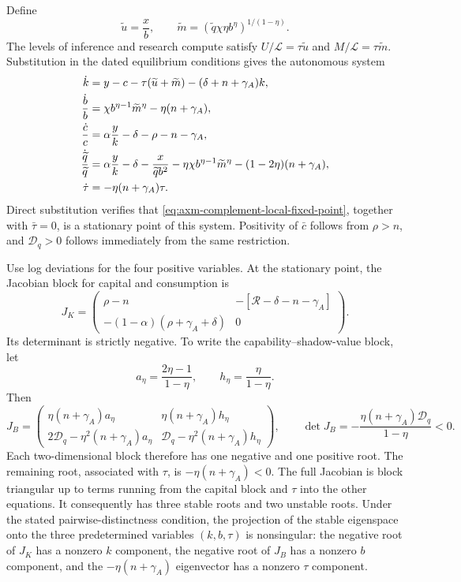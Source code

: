 Define
\[
 \widetilde u=\frac{x}{b},\qquad
 \widetilde m=
 \left(\widetilde q\chi\eta b^\eta\right)^{1/(1-\eta)}.
\]
The levels of inference and research compute satisfy
\(U/\mathcal L=\tau\widetilde u\) and
\(M/\mathcal L=\tau\widetilde m\). Substitution in the dated equilibrium
conditions gives the autonomous system
\begin{align}
 \dot k&=y-c-\tau(\widetilde u+\widetilde m)
 -(\delta+n+\gamma_A)k,\notag\\
 \frac{\dot b}{b}&=\chi b^{\eta-1}\widetilde m^\eta-\eta(n+\gamma_A),\notag\\
 \frac{\dot c}{c}&=\alpha\frac{y}{k}-\delta-\rho-n-\gamma_A,\notag\\
 \frac{\dot{\widetilde q}}{\widetilde q}
 &=\alpha\frac{y}{k}-\delta
 -\frac{x}{\widetilde q b^2}
 -\eta\chi b^{\eta-1}\widetilde m^\eta
 -(1-2\eta)(n+\gamma_A),\notag\\
 \dot\tau&=-\eta(n+\gamma_A)\tau.
 \label{eq:axm-app-complement-autonomous-system}
\end{align}
Direct substitution verifies that
\eqref{eq:axm-complement-local-fixed-point}, together with \(\bar\tau=0\),
is a stationary point of this system. Positivity of \(\bar c\) follows from
\(\rho>n\), and \(\mathcal D_q>0\) follows immediately from the same
restriction.

Use log deviations for the four positive variables. At the stationary point,
the Jacobian block for capital and consumption is
\begin{equation}
 J_K=
 \begin{pmatrix}
  \rho-n&-[\mathcal R-\delta-n-\gamma_A]\\
  -(1-\alpha)(\rho+\gamma_A+\delta)&0
 \end{pmatrix}.
 \label{eq:axm-app-complement-capital-block}
\end{equation}
Its determinant is strictly negative. To write the
capability--shadow-value block, let
\[
 a_\eta=\frac{2\eta-1}{1-\eta},\qquad
 h_\eta=\frac{\eta}{1-\eta}.
\]
Then
\begin{equation}
 J_B=
 \begin{pmatrix}
  \eta(n+\gamma_A) a_\eta&\eta(n+\gamma_A) h_\eta\\
  2\mathcal D_q-\eta^2(n+\gamma_A) a_\eta&
  \mathcal D_q-\eta^2(n+\gamma_A) h_\eta
 \end{pmatrix},
 \qquad
 \det J_B=-\frac{\eta(n+\gamma_A)\mathcal D_q}{1-\eta}<0.
 \label{eq:axm-app-complement-capability-block}
\end{equation}
Each two-dimensional block therefore has one negative and one positive root.
The remaining root, associated with \(\tau\), is
\(-\eta(n+\gamma_A)<0\). The full
Jacobian is block triangular up to terms running from the capital block and
\(\tau\) into the other equations. It consequently has three stable roots and
two unstable roots. Under the stated pairwise-distinctness condition, the projection of
the stable eigenspace onto the three predetermined variables
\((k,b,\tau)\) is nonsingular: the negative root of \(J_K\) has a nonzero
\(k\) component, the negative root of \(J_B\) has a nonzero \(b\) component,
and the \(-\eta(n+\gamma_A)\) eigenvector has a nonzero \(\tau\) component.

